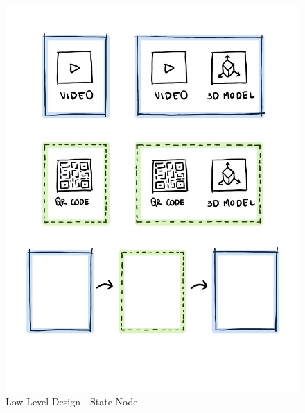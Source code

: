 \begin{figure}[h]
    \centering
    \includegraphics[width=\textwidth]{Figures/Editor/wireframes/stateNode.png}
    \caption{Low Level Design - State Node}
    \label{fig:stateNode}
\end{figure}

